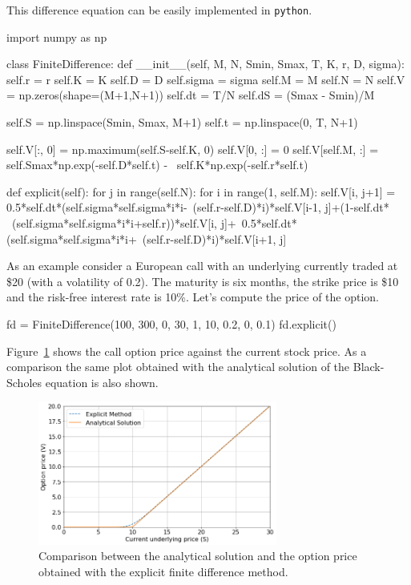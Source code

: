 This difference equation can be easily implemented in \texttt{python}.
\begin{ipython}
import numpy as np

class FiniteDifference:
    def __init__(self, M, N, Smin, Smax, T, K, r, D, sigma):
        self.r = r
        self.K = K
        self.D = D
        self.sigma = sigma
        self.M = M
        self.N = N
        self.V = np.zeros(shape=(M+1,N+1))   
        self.dt = T/N
        self.dS = (Smax - Smin)/M

        self.S = np.linspace(Smin, Smax, M+1)
        self.t = np.linspace(0, T, N+1)

        self.V[:, 0] = np.maximum(self.S-self.K, 0)
        self.V[0, :] = 0
        self.V[self.M, :] = self.Smax*np.exp(-self.D*self.t) - \
                            self.K*np.exp(-self.r*self.t)

    def explicit(self):
        for j in range(self.N):
            for i in range(1, self.M):
                self.V[i, j+1] = 0.5*self.dt*(self.sigma*self.sigma*i*i-\
                                 (self.r-self.D)*i)*self.V[i-1, j]+(1-self.dt* \
                                 (self.sigma*self.sigma*i*i+self.r))*self.V[i, j]+\
                                 0.5*self.dt*(self.sigma*self.sigma*i*i+\
                                 (self.r-self.D)*i)*self.V[i+1, j]
\end{ipython}             

As an example consider a European call with an underlying currently traded at \$20 (with a volatility of 0.2). The maturity is six months, the strike price is \$10 and the risk-free interest rate is 10\%. Let's compute the price of the option.
\begin{ipython}
fd = FiniteDifference(100, 300, 0, 30, 1, 10, 0.2, 0, 0.1)
fd.explicit()
\end{ipython}

Figure~\ref{fig:bs_finite_difference} shows the call option price against the current stock price. As a comparison the same plot obtained with the analytical solution of the Black-Scholes equation is also shown. 

\begin{figure}[htb]
	\centering
	\includegraphics[width=0.7\textwidth]{figures/bs_finite_difference}
	\caption{Comparison between the analytical solution and the option price obtained with the explicit finite difference method.}
	\label{fig:bs_finite_difference}
\end{figure} 

